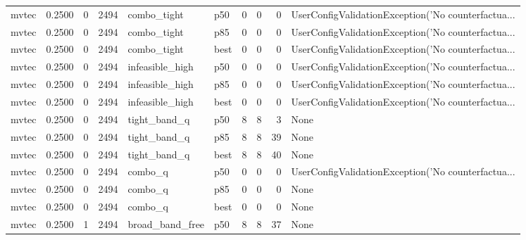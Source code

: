 \begin{tabular}{lrrrllrrrl}
   mvtec &    0.2500 &    0 &   2494 &          combo\_tight &    p50 &               0 &          0 &       0 & UserConfigValidationException('No counterfactua... \\
   mvtec &    0.2500 &    0 &   2494 &          combo\_tight &    p85 &               0 &          0 &       0 & UserConfigValidationException('No counterfactua... \\
   mvtec &    0.2500 &    0 &   2494 &          combo\_tight &   best &               0 &          0 &       0 & UserConfigValidationException('No counterfactua... \\
   mvtec &    0.2500 &    0 &   2494 &      infeasible\_high &    p50 &               0 &          0 &       0 & UserConfigValidationException('No counterfactua... \\
   mvtec &    0.2500 &    0 &   2494 &      infeasible\_high &    p85 &               0 &          0 &       0 & UserConfigValidationException('No counterfactua... \\
   mvtec &    0.2500 &    0 &   2494 &      infeasible\_high &   best &               0 &          0 &       0 & UserConfigValidationException('No counterfactua... \\
   mvtec &    0.2500 &    0 &   2494 &         tight\_band\_q &    p50 &               8 &          8 &       3 &                                               None \\
   mvtec &    0.2500 &    0 &   2494 &         tight\_band\_q &    p85 &               8 &          8 &      39 &                                               None \\
   mvtec &    0.2500 &    0 &   2494 &         tight\_band\_q &   best &               8 &          8 &      40 &                                               None \\
   mvtec &    0.2500 &    0 &   2494 &              combo\_q &    p50 &               0 &          0 &       0 & UserConfigValidationException('No counterfactua... \\
   mvtec &    0.2500 &    0 &   2494 &              combo\_q &    p85 &               0 &          0 &       0 &                                               None \\
   mvtec &    0.2500 &    0 &   2494 &              combo\_q &   best &               0 &          0 &       0 &                                               None \\
   mvtec &    0.2500 &    1 &   2494 &      broad\_band\_free &    p50 &               8 &          8 &      37 &                                               None \\

\end{tabular}
